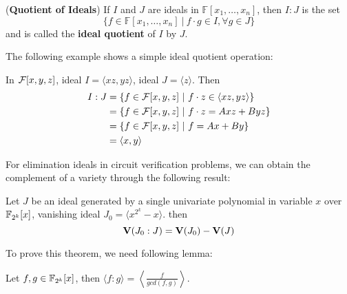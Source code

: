 \begin{Definition}
({\bf Quotient of Ideals}) If $I$ and $J$ are ideals in $\mathbb
  F[x_1, \dots, x_n]$, then $I:J$ is the set
  \begin{equation}
  \{f \in \mathbb F[x_1, \dots, x_n]\ |\ f\cdot g \in I, \forall g \in J\}\nonumber
  \end{equation}
and is called the {\bf ideal quotient} of $I$ by $J$.
\end{Definition}

The following example shows a simple ideal quotient operation:
\begin{Example}
In ${\mathcal{F}}[x,y,z]$, ideal $I = \langle xz,yz\rangle$, ideal $J = \langle z\rangle$. Then
\begin{align*}
I:J &= \{f\in{\mathcal{F}}[x,y,z]~|~f\cdot z \in \langle xz,yz\rangle\} \\
&= \{f\in{\mathcal{F}}[x,y,z]~|~f\cdot z = Axz+Byz\}\\
&= \{f\in{\mathcal{F}}[x,y,z]~|~f= Ax+By\}\\
&= \langle x,y\rangle
\end{align*}
\end{Example}


For elimination ideals in circuit verification problems, we can obtain
the complement of a variety through the following result:

\begin{Theorem}
\label{thm:quotient}
Let $J$ be an ideal generated by a single univariate polynomial in variable $x$ over ${\mathbb{F}}_{2^k}[x]$, vanishing ideal $J_0 = \langle x^{2^k}-x\rangle$. then 
$${\bf V}(J_0:J) = {\bf V}(J_0) - {\bf V}(J)$$
\end{Theorem}

To prove this theorem, we need following lemma:
\begin{Lemma}
\label{lem:gcd}
Let $f,g\in {\mathbb{F}}_{2^k}[x]$, then $\langle f:g\rangle = \left\langle\frac{f}{gcd(f,g)}\right\rangle$.
\end{Lemma}


